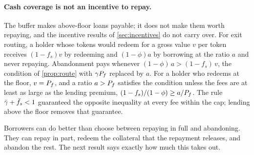 \paragraph{Cash coverage is not an incentive to repay.}
The buffer makes above-floor loans payable; it does not make them worth repaying, and the incentive results of \cref{sec:incentives} do not carry over. For exit routing, a holder whose tokens would redeem for a gross value $v$ per token receives $(1-f_s)v$ by redeeming and $(1-\phi)a$ by borrowing at the ratio $a$ and never repaying. Abandonment pays whenever $(1-\phi)\,a>(1-f_s)\,v$, the condition of \cref{prop:route} with $\gamma P_f$ replaced by $a$. For a holder who redeems at the floor, $v=P_f$, and a ratio $a>P_f$ satisfies the condition unless the fees are at least as large as the lending premium, $(1-f_s)/(1-\phi)\ge a/P_f$. The rule $\bar\gamma+\bar f_s<1$ guaranteed the opposite inequality at every fee within the cap; lending above the floor removes that guarantee.

Borrowers can do better than choose between repaying in full and abandoning. They can repay in part, redeem the collateral that the repayment releases, and abandon the rest. The next result says exactly how much this takes out.

